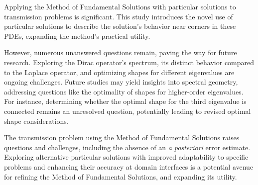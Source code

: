 \documentclass[5p,authoryear]{elsarticle}
\begin{document}
Applying the Method of Fundamental Solutions with particular solutions to transmission problems is significant. This study introduces the novel use of particular solutions to describe the solution's behavior near corners in these PDEs, expanding the method's practical utility.

However, numerous unanswered questions remain, paving the way for future research. Exploring the Dirac operator's spectrum, its distinct behavior compared to the Laplace operator, and optimizing shapes for different eigenvalues are ongoing challenges. Future studies may yield insights into spectral geometry, addressing questions like the optimality of shapes for higher-order eigenvalues. For instance, determining whether the optimal shape for the third eigenvalue is connected remains an unresolved question, potentially leading to revised optimal shape considerations.

The transmission problem using the Method of Fundamental Solutions raises questions and challenges, including the absence of an \textit{a posteriori} error estimate. Exploring alternative particular solutions with improved adaptability to specific problems and enhancing their accuracy at domain interfaces is a potential avenue for refining the Method of Fundamental Solutions, and expanding its utility.




{\scriptsize}
\end{document}
